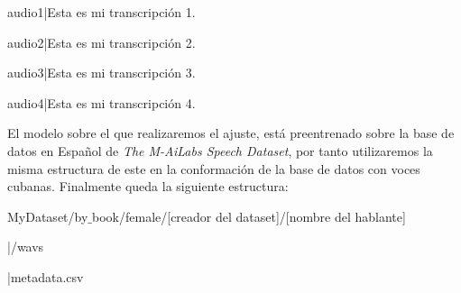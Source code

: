 \begin{center}
	audio1|Esta es mi transcripción 1.
	
	audio2|Esta es mi transcripción 2.
	
	audio3|Esta es mi transcripción 3.
	
	audio4|Esta es mi transcripción 4.
\end{center}

El modelo sobre el que realizaremos el ajuste, está preentrenado sobre la base de datos en Español de \textit{The M-AiLabs Speech Dataset}, por tanto utilizaremos la misma estructura de este en la conformación de la base de datos con voces cubanas. Finalmente queda la siguiente estructura:

\begin{flushleft}
	MyDataset/by$\_$book/female/[creador del dataset]/[nombre del hablante]
	
	|/wavs
	
	|metadata.csv
\end{flushleft}
	
	
















	





